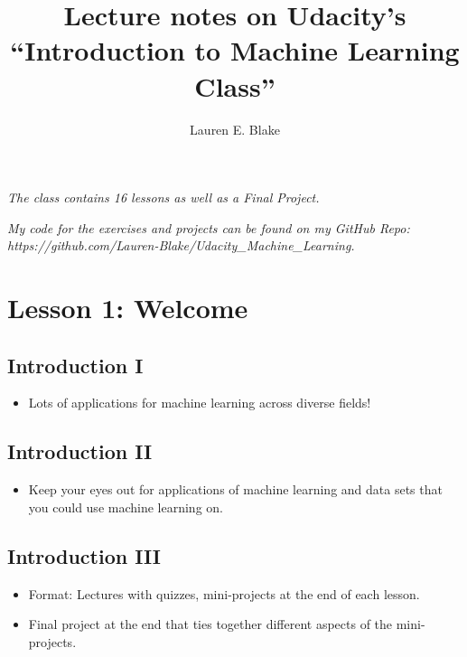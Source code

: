 \documentclass[12pt]{report}
\begin{document}
\title{Lecture notes on Udacity's ``Introduction to Machine Learning Class''}
\author{Lauren E. Blake}

\maketitle

\begin{flushleft}
\Large{\textit{The class contains 16 lessons as well as a Final Project.}}

\bigskip
\Large{\textit{My code for the exercises and projects can be found on my GitHub Repo: https://github.com/Lauren-Blake/Udacity\_Machine\_Learning.}}
\end{flushleft}

\bigskip 
\section{Lesson 1: Welcome}

\subsection{Introduction I}

\begin{itemize}

\item Lots of applications for machine learning across diverse fields!

\end{itemize}

\subsection{Introduction II}

\begin{itemize}

\item Keep your eyes out for applications of machine learning and data sets that you could use machine learning on. 

\end{itemize}

\subsection{Introduction III}

\begin{itemize}

\item Format: Lectures with quizzes, mini-projects at the end of each lesson.

\item Final project at the end that ties together different aspects of the mini-projects. 

\end{itemize}
\end{document}

